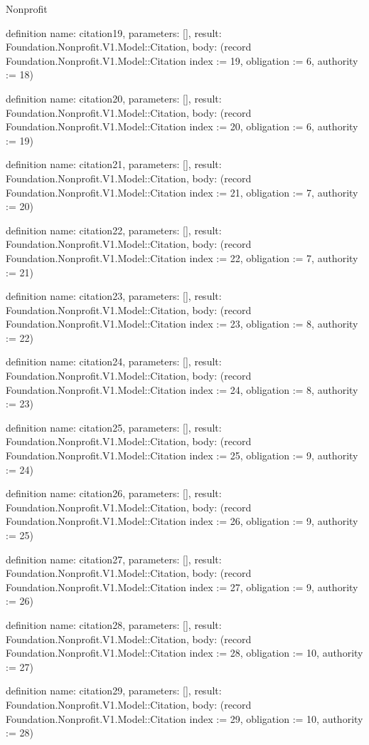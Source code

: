 \begin{lexlean}{Nonprofit}
\begin{semanticmodule}
definition{
  name: citation19,
  parameters: [],
  result: Foundation.Nonprofit.V1.Model::Citation,
  body: (record Foundation.Nonprofit.V1.Model::Citation {index := 19, obligation := 6, authority := 18})
}

definition{
  name: citation20,
  parameters: [],
  result: Foundation.Nonprofit.V1.Model::Citation,
  body: (record Foundation.Nonprofit.V1.Model::Citation {index := 20, obligation := 6, authority := 19})
}

definition{
  name: citation21,
  parameters: [],
  result: Foundation.Nonprofit.V1.Model::Citation,
  body: (record Foundation.Nonprofit.V1.Model::Citation {index := 21, obligation := 7, authority := 20})
}

definition{
  name: citation22,
  parameters: [],
  result: Foundation.Nonprofit.V1.Model::Citation,
  body: (record Foundation.Nonprofit.V1.Model::Citation {index := 22, obligation := 7, authority := 21})
}

definition{
  name: citation23,
  parameters: [],
  result: Foundation.Nonprofit.V1.Model::Citation,
  body: (record Foundation.Nonprofit.V1.Model::Citation {index := 23, obligation := 8, authority := 22})
}

definition{
  name: citation24,
  parameters: [],
  result: Foundation.Nonprofit.V1.Model::Citation,
  body: (record Foundation.Nonprofit.V1.Model::Citation {index := 24, obligation := 8, authority := 23})
}

definition{
  name: citation25,
  parameters: [],
  result: Foundation.Nonprofit.V1.Model::Citation,
  body: (record Foundation.Nonprofit.V1.Model::Citation {index := 25, obligation := 9, authority := 24})
}

definition{
  name: citation26,
  parameters: [],
  result: Foundation.Nonprofit.V1.Model::Citation,
  body: (record Foundation.Nonprofit.V1.Model::Citation {index := 26, obligation := 9, authority := 25})
}

definition{
  name: citation27,
  parameters: [],
  result: Foundation.Nonprofit.V1.Model::Citation,
  body: (record Foundation.Nonprofit.V1.Model::Citation {index := 27, obligation := 9, authority := 26})
}

definition{
  name: citation28,
  parameters: [],
  result: Foundation.Nonprofit.V1.Model::Citation,
  body: (record Foundation.Nonprofit.V1.Model::Citation {index := 28, obligation := 10, authority := 27})
}

definition{
  name: citation29,
  parameters: [],
  result: Foundation.Nonprofit.V1.Model::Citation,
  body: (record Foundation.Nonprofit.V1.Model::Citation {index := 29, obligation := 10, authority := 28})
}


\end{semanticmodule}
\end{lexlean}
